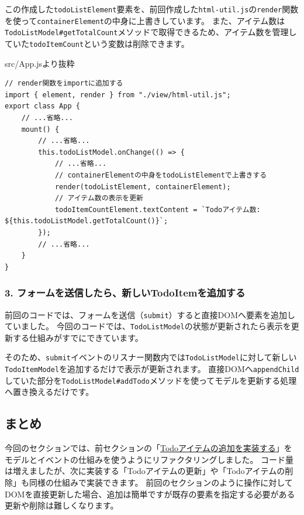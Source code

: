 この作成した\texttt{todoListElement}要素を、前回作成した\texttt{html-util.js}の\texttt{render}関数を使って\texttt{containerElement}の中身に上書きしています。
また、アイテム数は\texttt{TodoListModel\#getTotalCount}メソッドで取得できるため、アイテム数を管理していた\texttt{todoItemCount}という変数は削除できます。

\begin{listtitle}
src/App.jsより抜粋
\end{listtitle}
\begin{lstlisting}
// render関数をimportに追加する
import { element, render } from "./view/html-util.js";
export class App {
    // ...省略...
    mount() {
        // ...省略...
        this.todoListModel.onChange(() => {
            // ...省略...
            // containerElementの中身をtodoListElementで上書きする
            render(todoListElement, containerElement);
            // アイテム数の表示を更新
            todoItemCountElement.textContent = `Todoアイテム数: ${this.todoListModel.getTotalCount()}`;
        });
        // ...省略...
    }
}
\end{lstlisting}
\listend

\hypertarget{app-add-new-todoitem}{%
\subsubsection{3. フォームを送信したら、新しいTodoItemを追加する}\label{app-add-new-todoitem}}

前回のコードでは、フォームを送信（\texttt{submit}）すると直接DOMへ要素を追加していました。
今回のコードでは、\texttt{TodoListModel}の状態が更新されたら表示を更新する仕組みがすでにできています。

そのため、\texttt{submit}イベントのリスナー関数内では\texttt{TodoListModel}に対して新しい\texttt{TodoItemModel}を追加するだけで表示が更新されます。
直接DOMへ\texttt{appendChild}していた部分を\texttt{TodoListModel\#addTodo}メソッドを使ってモデルを更新する処理へ置き換えるだけです。

\hypertarget{conclusion}{%
\subsection{まとめ}\label{conclusion}}

今回のセクションでは、前セクションの「\href{../form-event/README.md}{Todoアイテムの追加を実装する}」をモデルとイベントの仕組みを使うようにリファクタリングしました。
コード量は増えましたが、次に実装する「Todoアイテムの更新」や「Todoアイテムの削除」も同様の仕組みで実装できます。
前回のセクションのように操作に対してDOMを直接更新した場合、追加は簡単ですが既存の要素を指定する必要がある更新や削除は難しくなります。

